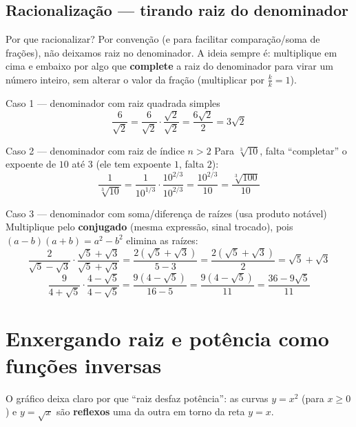 \documentclass[12pt,a4paper]{article}
\begin{document}
\subsection{Racionalização — tirando raiz do denominador}

\begin{dica}{Por que racionalizar?}
Por convenção (e para facilitar comparação/soma de frações), não deixamos
raiz no denominador. A ideia sempre é: multiplique em cima e embaixo por
algo que \textbf{complete} a raiz do denominador para virar um número
inteiro, sem alterar o valor da fração (multiplicar por $\frac{k}{k}=1$).
\end{dica}

\begin{exemplo}{Caso 1 — denominador com raiz quadrada simples}
\[
\frac{6}{\sqrt2} = \frac{6}{\sqrt2}\cdot\frac{\sqrt2}{\sqrt2} = \frac{6\sqrt2}{2} = 3\sqrt2
\]
\end{exemplo}

\begin{exemplo}{Caso 2 — denominador com raiz de índice $n>2$}
Para $\sqrt[3]{10}$, falta ``completar'' o expoente de $10$ até $3$ (ele
tem expoente $1$, falta $2$):
\[
\frac{1}{\sqrt[3]{10}} = \frac{1}{10^{1/3}}\cdot\frac{10^{2/3}}{10^{2/3}} = \frac{10^{2/3}}{10} = \frac{\sqrt[3]{100}}{10}
\]
\end{exemplo}

\begin{exemplo}{Caso 3 — denominador com soma/diferença de raízes (usa produto notável)}
Multiplique pelo \textbf{conjugado} (mesma expressão, sinal trocado), pois
$(a-b)(a+b)=a^2-b^2$ elimina as raízes:
\[
\frac{2}{\sqrt5-\sqrt3}\cdot\frac{\sqrt5+\sqrt3}{\sqrt5+\sqrt3} = \frac{2(\sqrt5+\sqrt3)}{5-3} = \frac{2(\sqrt5+\sqrt3)}{2} = \sqrt5+\sqrt3
\]
\[
\frac{9}{4+\sqrt5}\cdot\frac{4-\sqrt5}{4-\sqrt5} = \frac{9(4-\sqrt5)}{16-5} = \frac{9(4-\sqrt5)}{11} = \frac{36-9\sqrt5}{11}
\]
\end{exemplo}

\section{Enxergando raiz e potência como funções inversas}

O gráfico deixa claro por que ``raiz desfaz potência'': as curvas
$y=x^2$ (para $x\ge0$) e $y=\sqrt{x}$ são \textbf{reflexos} uma da outra em
torno da reta $y=x$.

\begin{center}
\end{center}
\end{document}
